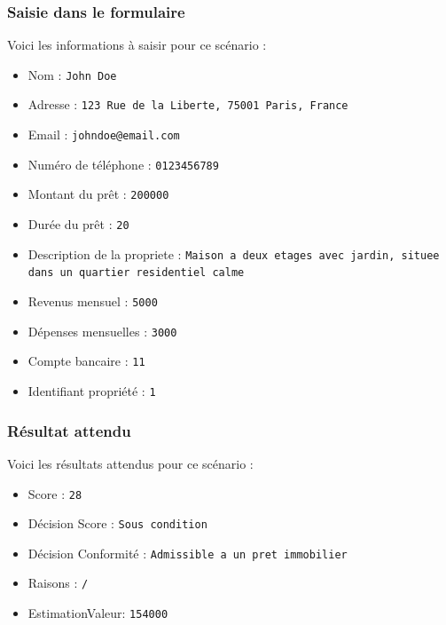 \documentclass{article}
\begin{document}
    \subsubsection{Saisie dans le formulaire}
    Voici les informations à saisir pour ce scénario :
    \begin{itemize}
        \item Nom : \texttt{John Doe}
        \item Adresse : \texttt{123 Rue de la Liberte, 75001 Paris, France}
        \item Email : \texttt{johndoe@email.com}
        \item Numéro de téléphone : \texttt{0123456789}
        \item Montant du prêt : \texttt{200000}
        \item Durée du prêt : \texttt{20}
        \item Description de la propriete : \texttt{Maison a deux etages avec jardin, situee dans un quartier residentiel calme}  
        \item Revenus mensuel : \texttt{5000} 
        \item Dépenses mensuelles : \texttt{3000}  
        \item Compte bancaire : \texttt{11}  
        \item Identifiant propriété : \texttt{1}
    \end{itemize}  
    
    \subsubsection{Résultat attendu}
    Voici les résultats attendus pour ce scénario :
    \begin{itemize}
        \item Score : \texttt{28}
        \item Décision Score : \texttt{Sous condition}
        \item Décision Conformité : \texttt{Admissible a un pret immobilier}
        \item Raisons : \texttt{/}
        \item EstimationValeur: \texttt{154000}
    \end{itemize}
    
\end{document}
